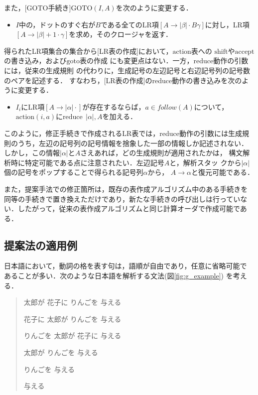 また，[GOTO手続き]$\mbox{GOTO}(I,A)$を次のように変更する．
\begin{itemize}
\item $I$中の，ドットのすぐ右が$B$である全てのLR項$[ A \rightarrow
  |\beta| \cdot B \gamma ]$に対し，LR項$[ A \rightarrow |\beta|+1
  \cdot \gamma ]$を求め，そのクロージャを返す．
\end{itemize}

得られたLR項集合の集合から[LR表の作成]において，$\mbox{action}$表への
$\mbox{shift}$や$\mbox{accept}$の書き込み，および$\mbox{goto}$表の作成
にも変更点はない．一方，$\mbox{reduce}$動作の引数には，従来の生成規則
の代わりに，生成記号の左辺記号と右辺記号列の記号数のペアを記述する．
すなわち，[LR表の作成]のreduce動作の書き込みを次のように変更する．
\begin{itemize}
\item $I_i$にLR項$[A \rightarrow |\alpha| \cdot ]$が存在するならば，$a
  \in follow(A)$について，$\mbox{action}(i,a)$に$\mbox{reduce} ~~
  |\alpha|, A$を加える．
\end{itemize}

このように，修正手続きで作成されるLR表では，reduce動作の引数には生成規
則のうち，左辺の記号列の記号情報を捨象した一部の情報しか記述されない．
しかし，この情報$|\alpha|$と$A$さえあれば，どの生成規則が適用されたかは，
構文解析時に特定可能である点に注意されたい．左辺記号$A$と，解析スタッ
クから$|\alpha|$個の記号をポップすることで得られる記号列$\alpha$から，
$A \rightarrow \alpha$と復元可能である．

また，提案手法での修正箇所は，既存の表作成アルゴリズム中のある手続きを
同等の手続きで置き換えただけであり，新たな手続きの呼び出しは行っていな
い．したがって，従来の表作成アルゴリズムと同じ計算オーダで作成可能であ
る．
\newpage
\subsection{提案法の適用例}

日本語において，動詞の格を表す句は，語順が自由であり，任意に省略可能で
あることが多い．次のような日本語を解析する文法(図\ref{fig:g_example})
を考える．
\begin{quote}
太郎が 花子に りんごを 与える

花子に 太郎が りんごを 与える

りんごを 太郎が 花子に 与える

太郎が りんごを 与える

りんごを 与える

与える
\end{quote}

